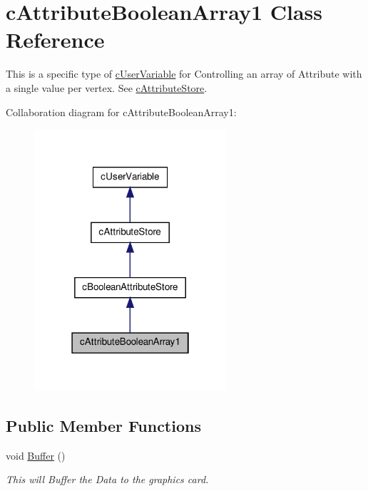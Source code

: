 \hypertarget{classc_attribute_boolean_array1}{
\section{cAttributeBooleanArray1 Class Reference}
\label{classc_attribute_boolean_array1}
}


This is a specific type of \hyperlink{classc_user_variable}{cUserVariable} for Controlling an array of Attribute with a single value per vertex. See \hyperlink{classc_attribute_store}{cAttributeStore}.  




Collaboration diagram for cAttributeBooleanArray1:\nopagebreak
\begin{figure}[H]
\begin{center}
\leavevmode
\includegraphics[width=202pt]{classc_attribute_boolean_array1__coll__graph}
\end{center}
\end{figure}
\subsection*{Public Member Functions}
\begin{DoxyCompactItemize}
\item 
\hypertarget{classc_attribute_boolean_array1_aec7dcc6e13a59c1bc4c3b1330d873777}{
void \hyperlink{classc_attribute_boolean_array1_aec7dcc6e13a59c1bc4c3b1330d873777}{Buffer} ()}
\label{classc_attribute_boolean_array1_aec7dcc6e13a59c1bc4c3b1330d873777}

\begin{DoxyCompactList}\small\item\em This will Buffer the Data to the graphics card. \end{DoxyCompactList}\end{DoxyCompactItemize}



